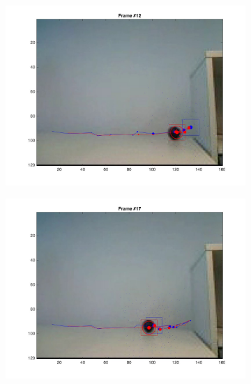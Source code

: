 \documentclass{ethz_report}
\begin{document}
\begin{figure}[h]
\begin{subfigure}[b]{.25\textwidth}
        \includegraphics[width=1\linewidth]{images/video3_bins_low_11}
    \end{subfigure}%
    \begin{subfigure}[b]{.25\textwidth}
        \centering
        \includegraphics[width=1\linewidth]{images/video3_bins_low_16}
    \end{subfigure}
    \begin{subfigure}[b]{.25\textwidth}
        \centering

\end{subfigure}
\end{figure}
\end{document}
